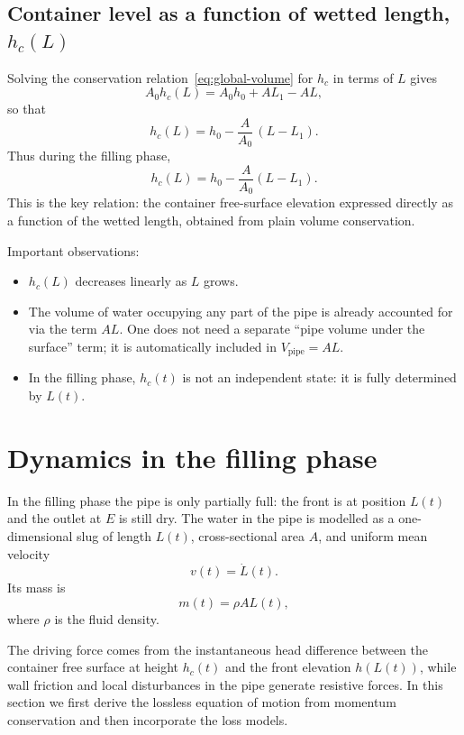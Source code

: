 \documentclass[11pt]{article}
\begin{document}
\subsection{Container level as a function of wetted length, $h_c(L)$}

Solving the conservation relation~\eqref{eq:global-volume} for $h_c$ in terms of $L$ gives
\[
  A_0 h_c(L) = A_0 h_0 + A L_1 - A L,
\]
so that
\[
  h_c(L) = h_0 - \frac{A}{A_0}\,(L - L_1).
\]
Thus during the filling phase,
\begin{equation}
  h_c(L) = h_0 - \frac{A}{A_0}(L - L_1).
  \label{eq:hc-of-L}
\end{equation}
This is the key relation: the container free-surface elevation expressed directly as a function
of the wetted length, obtained from plain volume conservation.

Important observations:
\begin{itemize}
  \item $h_c(L)$ decreases linearly as $L$ grows.
  \item The volume of water occupying any part of the pipe is already accounted for via the
        term $A L$. One does not need a separate ``pipe volume under the surface'' term;
        it is automatically included in $V_{\text{pipe}} = A L$.
  \item In the filling phase, $h_c(t)$ is not an independent state: it is fully determined by
        $L(t)$.
\end{itemize}

\section{Dynamics in the filling phase}

In the filling phase the pipe is only partially full: the front is at position $L(t)$ and the outlet
at $E$ is still dry. The water in the pipe is modelled as a one-dimensional slug of length $L(t)$,
cross-sectional area $A$, and uniform mean velocity
\[
  v(t) = \dot L(t).
\]
Its mass is
\[
  m(t) = \rho A L(t),
\]
where $\rho$ is the fluid density.

The driving force comes from the instantaneous head difference between the container
free surface at height $h_c(t)$ and the front elevation $h(L(t))$, while wall friction and local
disturbances in the pipe generate resistive forces. In this section we first derive the lossless
equation of motion from momentum conservation and then incorporate the loss models.
\end{document}
